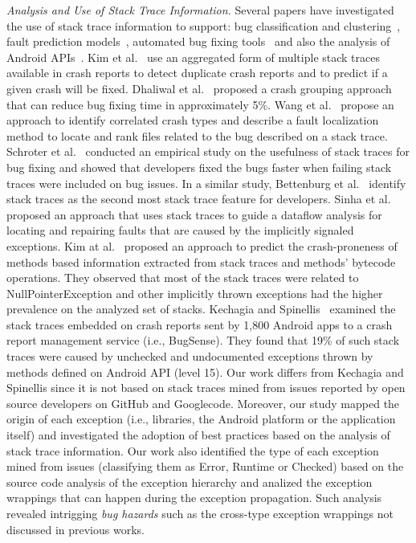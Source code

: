 \documentclass[conference]{IEEEtran}
\begin{document}
\textit{Analysis and Use of Stack Trace Information.} Several papers have
investigated the use of stack trace information to support: bug classification
and clustering~\cite{wang2013improving, kim2011crash, dhaliwal2011classifying},
fault prediction models~\cite{kim2013predicting}, automated
bug fixing tools~\cite{sinha2009fault} and also the analysis of Android APIs~\cite{kechagia2014}. 
Kim et al.~\cite{kim2011crash} use an
aggregated form of multiple stack traces available in crash reports to detect
duplicate crash reports and to predict if a given crash will be fixed. Dhaliwal
et al.~\cite{dhaliwal2011classifying} proposed a crash grouping approach that
can reduce bug fixing time in approximately 5\%. Wang et
al.~\cite{wang2013improving} propose an approach to identify correlated crash
types and describe a fault localization method to locate and rank files related
to the bug described on a stack trace. Schroter et al.~\cite{schroter2010stack}
conducted an empirical study on the usefulness of stack traces for bug fixing
and showed that developers fixed the bugs faster when failing stack traces were
included on bug issues.  In a similar study, Bettenburg et
al.~\cite{bettenburg2008makes} identify stack traces as the second most stack
trace feature for developers.  Sinha et al.~\cite{sinha2009fault} proposed an
approach that uses stack traces to guide a dataflow analysis for locating and
repairing faults that are caused by the implicitly signaled exceptions. Kim
at al.~\cite{kim2013predicting} proposed an approach to predict the
crash-proneness of methods based information extracted from stack traces and
methods' bytecode operations.  They observed that most of the stack traces were
related to NullPointerException and other implicitly thrown exceptions had
the higher prevalence on the analyzed set of stacks. Kechagia and Spinellis~\cite{kechagia2014}
examined the stack traces embedded on crash reports sent by 1,800 Android apps 
to a crash report management service (i.e., BugSense). They found that 19\% of such stack traces
were caused by unchecked and undocumented exceptions thrown by methods defined on 
Android API (level 15). Our work differs from Kechagia and Spinellis since it is not based on
stack traces mined from issues reported by open source developers on GitHub and Googlecode.  
Moreover, our study mapped the origin of each exception 
(i.e., libraries, the Android platform or the application itself) and investigated
the adoption of best practices based on the analysis of stack trace information.
Our work also identified the type of each exception mined from issues
(classifying them as Error, Runtime or Checked) based on the source code
analysis of the exception hierarchy and analized the exception wrappings that can 
happen during the exception propagation.  Such analysis revealed intrigging 
\emph{bug hazards} such as the cross-type exception wrappings not discussed in previous works.
\end{document}
